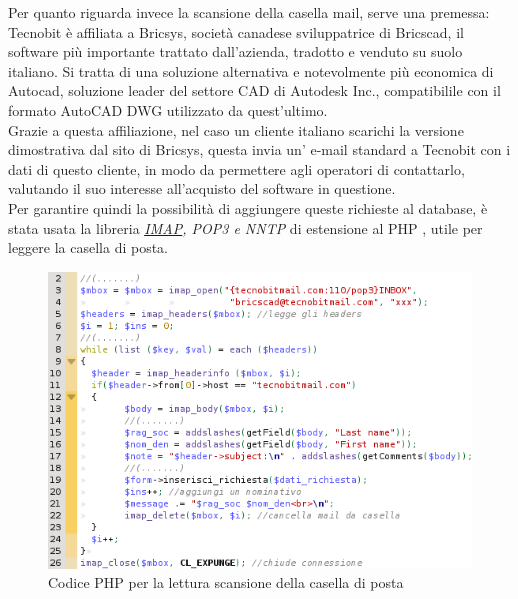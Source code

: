 \noindent
Per quanto riguarda invece la scansione della casella mail, serve una premessa: Tecnobit \`e affiliata a Bricsys, societ\`a canadese sviluppatrice di Bricscad, il software pi\`u importante trattato dall'azienda, tradotto e venduto su suolo italiano. Si tratta di una soluzione alternativa e notevolmente pi\`u economica di Autocad, soluzione leader del settore CAD di Autodesk Inc., compatibilile con il formato AutoCAD DWG utilizzato da quest'ultimo. \\
Grazie a questa affiliazione, nel caso un cliente italiano scarichi la versione dimostrativa dal sito di Bricsys, questa invia un' e-mail standard a Tecnobit con i dati di questo cliente, in modo da permettere agli operatori di contattarlo, valutando il suo interesse all'acquisto del software in questione.\\
Per garantire quindi la possibilit\`a di aggiungere queste richieste al database, \`e stata usata la libreria \textit{\hyperlink{imap}{\underline{IMAP}}, POP3 e NNTP} di estensione al PHP \cite{quattro}, utile per leggere la casella di posta.
\newpage

\begin{figure}[!ht]
\centering
  \includegraphics[scale=0.9]{./images/codicebrics.png}
\caption{Codice PHP per la lettura scansione della casella di posta}
\label{bricscode}
\end{figure}

